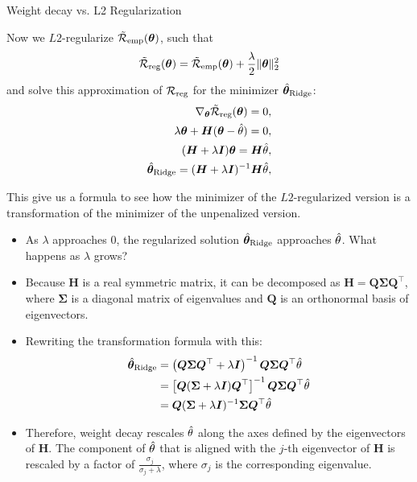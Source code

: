 \begin{vbframe}{Weight decay vs. L2 Regularization}
\lz

Now we $L2$-regularize $\mathcal{\tilde R}_{\text{emp}}(\bm{\theta})$, such that
\[
\mathcal{\tilde R}_{\text{reg}}(\bm{\theta}) = \mathcal{\tilde R}_{\text{emp}}(\bm{\theta}) + \frac{\lambda}{2} \|\bm{\theta}\|^2_2\]
and solve this approximation of $\mathcal{R}_{\text{reg}}$ for the minimizer $\hat{\bm{\theta}}_{\text{Ridge}}$:
\begin{align*}
 \nabla_{\bm{\theta}}\mathcal{\tilde R}_{\text{reg}}(\bm{\theta}) = 0,\\
  \lambda \bm{\theta} + \bm{H}(\bm{\theta} - \hat{\theta}) = 0,\\
      (\bm{H} + \lambda \boldsymbol{I}) \bm{\theta} = \bm{H} \hat{\theta},\\
      \hat{\bm{\theta}}_{\text{Ridge}} = (\bm{H} + \lambda \boldsymbol{I})^{-1}\bm{H} \hat{\theta},
\end{align*}

This give us a formula to see how the minimizer of the $L2$-regularized version is a transformation of the minimizer of the unpenalized version.


\framebreak

  \begin{itemize}
    \item As $\lambda$ approaches $0$, the regularized solution $\hat{\bm{\theta}}_{\text{Ridge}}$ approaches $\hat{\theta}$. What happens as $\lambda$ grows?
    \item Because $\bm{H}$ is a real symmetric matrix, it can be decomposed as $\bm{H} = \bm{Q} \bm{\Sigma} \bm{Q}^\top$, where $\bm{\Sigma}$ is a diagonal matrix of eigenvalues and $\bm{Q}$ is an orthonormal basis of eigenvectors.
    \item Rewriting the transformation formula with this:
  \begin{equation*}
    \begin{aligned}
    \hat{\bm{\theta}}_{\text{Ridge}} &=\left(\bm{Q} \bm{\Sigma} \bm{Q}^{\top}+\lambda \boldsymbol{I}\right)^{-1} \bm{Q} \bm{\Sigma} \bm{Q}^{\top} \hat{\theta} \\
              &=\left[\bm{Q}(\bm{\Sigma}+\lambda \boldsymbol{I}) \bm{Q}^{\top}\right]^{-1} \bm{Q} \bm{\Sigma} \bm{Q}^{\top} \hat{\theta} \\
              &=\bm{Q}(\bm{\Sigma} + \lambda \boldsymbol{I})^{-1} \bm{\Sigma} \bm{Q}^{\top} \hat{\theta}
    \end{aligned}
  \end{equation*}
    \item Therefore, weight decay rescales $\hat{\theta}$ along the axes defined by the eigenvectors of $\bm{H}$. The component of $\hat{\theta}$ that is aligned with the $j$-th eigenvector of $\bm{H}$ is rescaled by a factor of $\frac{\sigma_j}{\sigma_j + \lambda}$, where $\sigma_j$ is the corresponding eigenvalue.
\end{itemize}


\end{vbframe}
